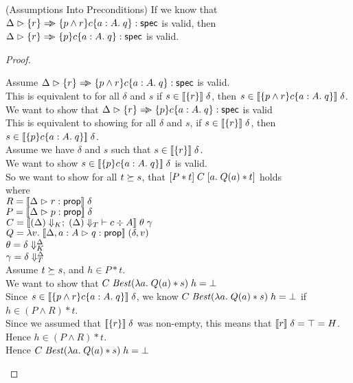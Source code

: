 \begin{lemma}{(Assumptions Into Preconditions)}
If we know that $\judgeS{\setof{r} \specimp \spec{p \land r}{c}{a:A}{q}}$ is
valid, then $\judgeS{\setof{r} \specimp \spec{p}{c}{a:A}{q}}$ is valid.
\end{lemma}

\begin{proof}
\begin{tabbedproof}
  \oo Assume $\judgeS{\setof{r} \specimp \spec{p \land r}{c}{a:A}{q}}$ is valid. \\
  \ooo This is equivalent to for all $\delta$ and $s$ if $s \in \interp{\setof{r}}\;\delta$, then $s \in \interp{\spec{p \land r}{c}{a:A}{q}}\;\delta$. \\
  \ooo We want to show that $\judgeS{\setof{r} \specimp \spec{p}{c}{a:A}{q}}$ is valid \\
  \ooo This is equivalent to showing for all $\delta$ and $s$, if $s \in \interp{\setof{r}}\;\delta$, then $s \in \interp{\spec{p}{c}{a:A}{q}}\;\delta$. \\
  \ooo Assume we have $\delta$ and $s$ such that $s \in \interp{\setof{r}}\;\delta$. \\
  \oooo We want to show $s \in \interp{\spec{p}{c}{a:A}{q}}\;\delta$ is valid. \\
  \oooo So we want to show for all $t \worldgeq s$, that $\basicspec{P*t}{C}{a}{Q(a) * t}$ holds\\
  \ooox where \\
  \oooox $R = \interp{\judgeA{r}{\assert}}\;\delta$ \\
  \oooox $P = \interp{\judgeA{p}{\assert}}\;\delta$ \\
  \oooox $C = \interp{\judgeC[\restrictkind{\Delta}]{\restricttype{\Delta}}{c}{A}}\;\theta\;\gamma$ \\
  \oooox $Q = \semfun{v}{\interp{\judgeA[\Delta,a:A]{q}{\assert}}\;(\delta,v)}$ \\
  \oooox $\theta = \restricttyenv{\Delta}{\delta}$ \\
  \oooox $\gamma = \restrictvals{\Delta}{\delta}$ \\
  \oooo Assume $t \worldgeq s$, and $h \in P * t$. \\
  \ooooo We want to show that $C\;\mathit{Best}(\semfun{a}{Q(a) * s})\;h = \bot$ \\
  \ooooo Since $s \in \interp{\spec{p \land r}{c}{a:A}{q}}\;\delta$, we know $C\;\mathit{Best}(\semfun{a}{Q(a) * s})\;h = \bot$ if  $h \in (P \land R) * t$. \\
  \ooooo Since we assumed that $\interp{\setof{r}}\;\delta$ was non-empty, this means that $\interp{r}\;\delta = \top = H$. \\
  \ooooo Hence $h \in (P \land R) * t$. \\
  \ooooo Hence $C\;\mathit{Best}(\semfun{a}{Q(a) * s})\;h = \bot$ \\ 
\end{tabbedproof}
\end{proof}

